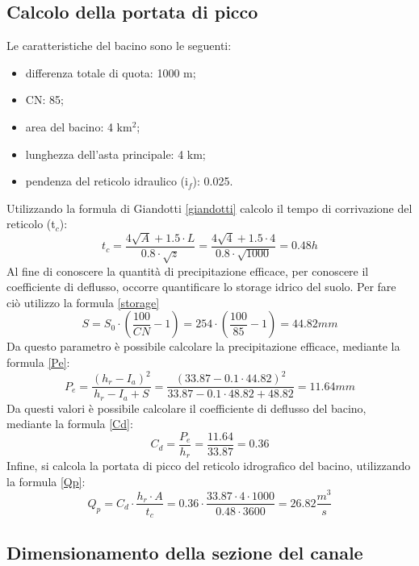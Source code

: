 \subsection{Calcolo della portata di picco} \label{portatadipicco}
Le caratteristiche del bacino sono le seguenti:
\begin{itemize}
    \item differenza totale di quota: 1000 m;
    \item CN: 85;
    \item area del bacino: 4 km$^2$;
    \item lunghezza dell'asta principale: 4 km;
    \item pendenza del reticolo idraulico (i$_f$): 0.025.
\end{itemize}
Utilizzando la formula di Giandotti \ref{giandotti} calcolo il tempo di corrivazione del reticolo (t$_c$):
\begin{equation}
    t_c = \frac{4 \sqrt{A} + 1.5 \cdot L}{0.8 \cdot \sqrt{z}} = \frac{4 \sqrt{4} + 1.5 \cdot 4}{0.8 \cdot \sqrt{1000}} = 0.48 h
\end{equation}
Al fine di conoscere la quantità di precipitazione efficace, per conoscere il coefficiente di deflusso, occorre quantificare lo storage idrico del suolo. Per fare ciò utilizzo la formula \ref{storage}
\begin{equation}
    S = S_0 \cdot \left ( \frac{100}{CN} -1 \right ) = 254 \cdot \left ( \frac{100}{85} - 1 \right) = 44.82mm
\end{equation}
Da questo parametro è possibile calcolare la precipitazione efficace, mediante la formula \ref{Pe}:
\begin{equation}
    P_e = \frac{(h_r - I_a)^2}{h_r - I_a + S} = \frac{(33.87 - 0.1 \cdot44.82)^2}{33.87 - 0.1\cdot48.82 + 48.82}= 11.64 mm
\end{equation}
Da questi valori è possibile calcolare il coefficiente di deflusso del bacino, mediante la formula \ref{Cd}:
\begin{equation}
    C_d = \frac{P_e}{h_r} = \frac{11.64}{33.87}= 0.36
\end{equation}
Infine, si calcola la portata di picco del reticolo idrografico del bacino, utilizzando la formula \ref{Qp}:
\begin{equation}
    Q_p = C_d \cdot \frac{h_r \cdot A}{t_c} = 0.36 \cdot \frac{33.87 \cdot 4 \cdot 1000}{0.48 \cdot 3600} = 26.82 \frac{m^3}{s}
\end{equation}

\subsection{Dimensionamento della sezione del canale} 
